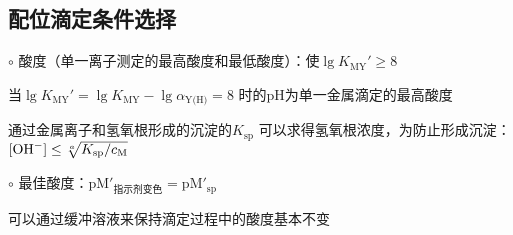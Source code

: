 \subsection{配位滴定条件选择}%
\label{sub:配位滴定条件选择}
$\circ$ 酸度（单一离子测定的最高酸度和最低酸度）：使$\lg K_\text{MY}'\ge 8$

当$\lg K_\text{MY}'=\lg K_\text{MY}-\lg\alpha_\text{Y(H)}=8$ 时的pH为单一金属滴定的最高酸度

通过金属离子和氢氧根形成的沉淀的$K_\text{sp}$ 可以求得氢氧根浓度，为防止形成沉淀：$[\ce{OH-}]\le \sqrt[a]{K_\text{sp}/c_\text{M}}$

$\circ$ 最佳酸度：$\text{pM}'_\text{指示剂变色}=\text{pM}'_\text{sp}$
\begin{notation}
    可以通过缓冲溶液来保持滴定过程中的酸度基本不变
\end{notation}
